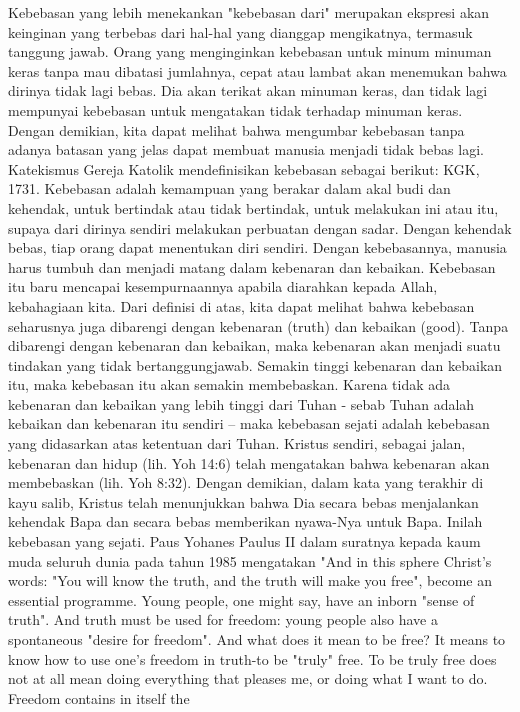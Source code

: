 Kebebasan yang lebih menekankan "kebebasan dari" merupakan ekspresi akan
keinginan yang terbebas dari hal-hal yang dianggap mengikatnya, termasuk
tanggung jawab. Orang yang menginginkan kebebasan untuk minum minuman keras
tanpa mau dibatasi jumlahnya, cepat atau lambat akan menemukan bahwa dirinya
tidak lagi bebas. Dia akan terikat akan minuman keras, dan tidak lagi mempunyai
kebebasan untuk mengatakan tidak terhadap minuman keras. Dengan demikian, kita
dapat melihat bahwa mengumbar kebebasan tanpa adanya batasan yang jelas dapat
membuat manusia menjadi tidak bebas lagi. Katekismus Gereja Katolik
mendefinisikan kebebasan sebagai berikut:
     KGK, 1731. Kebebasan adalah kemampuan yang berakar dalam akal budi
     dan kehendak, untuk bertindak atau tidak bertindak, untuk melakukan
     ini atau itu, supaya dari dirinya sendiri melakukan perbuatan dengan
     sadar. Dengan kehendak bebas, tiap orang dapat menentukan diri
     sendiri. Dengan kebebasannya, manusia harus tumbuh dan menjadi matang
     dalam kebenaran dan kebaikan. Kebebasan itu baru mencapai
     kesempurnaannya apabila diarahkan kepada Allah, kebahagiaan kita.
Dari definisi di atas, kita dapat melihat bahwa kebebasan seharusnya juga
dibarengi dengan kebenaran (truth) dan kebaikan (good). Tanpa dibarengi dengan
kebenaran dan kebaikan, maka kebenaran akan menjadi suatu tindakan yang tidak
bertanggungjawab. Semakin tinggi kebenaran dan kebaikan itu, maka kebebasan itu
akan semakin membebaskan. Karena tidak ada kebenaran dan kebaikan yang lebih
tinggi dari Tuhan -  sebab Tuhan adalah kebaikan dan kebenaran itu sendiri –
maka kebebasan sejati adalah kebebasan yang didasarkan atas ketentuan dari
Tuhan. Kristus sendiri, sebagai jalan, kebenaran dan hidup (lih. Yoh 14:6)
telah mengatakan bahwa kebenaran akan membebaskan (lih. Yoh 8:32). Dengan
demikian, dalam kata yang terakhir di kayu salib, Kristus telah menunjukkan
bahwa Dia secara bebas menjalankan kehendak Bapa dan secara bebas memberikan
nyawa-Nya untuk Bapa. Inilah kebebasan yang sejati.
Paus Yohanes Paulus II dalam suratnya kepada kaum muda seluruh dunia pada tahun
1985 mengatakan "And in this sphere Christ’s words: "You will know the truth,
and the truth will make you free", become an essential programme. Young people,
one might say, have an inborn "sense of truth". And truth must be used for
freedom: young people also have a spontaneous "desire for freedom". And what
does it mean to be free? It means to know how to use one’s freedom in truth-to
be "truly" free. To be truly free does not at all mean doing everything that
pleases me, or doing what I want to do. Freedom contains in itself the
